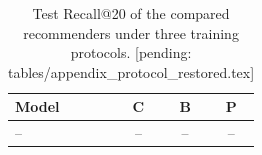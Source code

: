 \begin{table}[t]
\caption{Test Recall@20 of the compared recommenders under three training protocols. {\color{red}[pending: tables/appendix\_protocol\_restored.tex]}}
\label{tab:protocol_rest_sota}
\centering
\footnotesize
\begin{tabular}{lccc}
\toprule
Model & C & B & P \\
\midrule
-- & -- & -- & -- \\
\bottomrule
\end{tabular}
\end{table}
